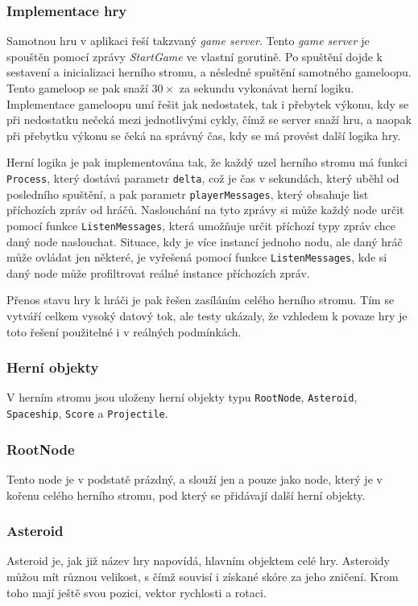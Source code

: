 \documentclass[12pt, a4paper]{article}
\begin{document}
    \subsubsection{Implementace hry}
    Samotnou hru v aplikaci řeší takzvaný \textit{game server}.
    Tento \textit{game server} je spouštěn pomocí zprávy \textit{StartGame} ve vlastní gorutině.
    Po spuštění dojde k sestavení a inicializaci herního stromu, a nésledné spuštění samotného gameloopu.
    Tento gameloop se pak snaží $30\times$ za sekundu vykonávat herní logiku.
    Implementace gameloopu umí řešit jak nedostatek, tak i přebytek výkonu, kdy se při nedostatku nečeká mezi jednotlivými cykly, čímž se server snaží  hru, a naopak při přebytku výkonu se čeká na správný čas, kdy se má provést další logika hry.

    Herní logika je pak implementována tak, že každý uzel herního stromu má funkci \texttt{Process}, který dostává parametr \texttt{delta}, což je čas v sekundách, který uběhl od posledního spuštění, a pak parametr \texttt{playerMessages}, který obsahuje list příchozích zpráv od hráčů.
    Naslouchání na tyto zprávy si může každý node určit pomocí funkce \texttt{ListenMessages}, která umožňuje určit příchozí typy zpráv chce daný node naslouchat.
    Situace, kdy je více instancí jednoho nodu, ale daný hráč může ovládat jen některé, je vyřešená pomocí funkce \texttt{ListenMessages}, kde si daný node může profiltrovat reálné instance příchozích zpráv.

    Přenos stavu hry k hráči je pak řešen zasíláním celého herního stromu.
    Tím se vytváří celkem vysoký datový tok, ale testy ukázaly, že vzhledem k povaze hry je toto řešení použitelné i v reálných podmínkách.

    \subsubsection{Herní objekty}
    V herním stromu jsou uloženy herní objekty typu \texttt{RootNode}, \texttt{Asteroid}, \texttt{Spaceship}, \texttt{Score} a \texttt{Projectile}.

    \subsubsection*{RootNode}
    Tento node je v podstatě prázdný, a slouží jen a pouze jako node, který je v kořenu celého herního stromu, pod který se přidávají další herní objekty.

    \subsubsection*{Asteroid}
    Asteroid je, jak již název hry napovídá, hlavním objektem celé hry.
    Asteroidy můžou mít různou velikost, s čímž souvisí i získané skóre za jeho zničení.
    Krom toho mají ještě svou pozici, vektor rychlosti a rotaci.
\end{document}
